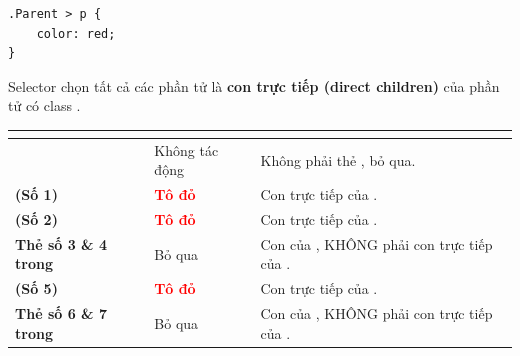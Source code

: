 \begin{codeWindow}
\begin{lstlisting}[language=CSS3]
.Parent > p {
    color: red;
}
\end{lstlisting}
\end{codeWindow}

\begin{conceptBox}
Selector  chọn tất cả các phần tử  là \textbf{con trực tiếp (direct children)} của phần tử có class .
\end{conceptBox}

\begin{prettyTableBox}
\sffamily\small
\begin{tabularx}{\linewidth}{|>{\bfseries}K{3.5cm}|>{\centering\arraybackslash}C{2.5cm}|Z|}
\hline
{}  &  &  \\
\hline
{} & Không tác động & Không phải thẻ , bỏ qua. \\
\hline
{} (Số 1) & \textcolor{red}{\textbf{Tô đỏ}} & Con trực tiếp của . \\
\hline
{} (Số 2) & \textcolor{red}{\textbf{Tô đỏ}} & Con trực tiếp của . \\
\hline
Thẻ  số 3 \& 4 trong  & Bỏ qua & Con của , KHÔNG phải con trực tiếp của . \\
\hline
{} (Số 5) & \textcolor{red}{\textbf{Tô đỏ}} & Con trực tiếp của . \\
\hline
Thẻ  số 6 \& 7 trong  & Bỏ qua & Con của , KHÔNG phải con trực tiếp của . \\
\hline
\end{tabularx}
\end{prettyTableBox}

